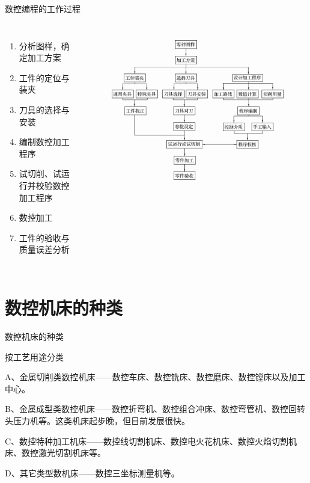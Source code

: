 \documentclass[UTF8,zihao=-4]{ctexbeamer}
\begin{document}
\begin{frame}{数控编程的工作过程}
\begin{columns}
\begin{enumerate}
	\item 分析图样，确定加工方案 
\item 工件的定位与装夹 
\item 刀具的选择与安装 
\item 编制数控加工程序 
\item 试切削、试运行并校验数控加工程序 
\item 数控加工 
\item 工件的验收与质量误差分析
\end{enumerate} 
	\begin{figure}
		\centering
		\includegraphics[width= \linewidth]{image/1-21}
		\label{fig:1-21}
	\end{figure}
\end{columns}
\end{frame}
\section{数控机床的种类}
\begin{frame}{数控机床的种类}

按工艺用途分类

A、金属切削类数控机床——数控车床、数控铣床、数控磨床、数控镗床以及加工中心。

B、金属成型类数控机床——数控折弯机、数控组合冲床、数控弯管机、数控回转头压力机等。这类机床起步晚，但目前发展很快。

C、数控特种加工机床——数控线切割机床、数控电火花机床、数控火焰切割机床、数控激光切割机床等。

D、其它类型数机床——数控三坐标测量机等。

\end{frame}
\end{document}
